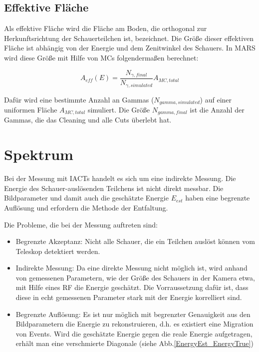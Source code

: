 \subsection{Effektive Fläche}
Als effektive Fläche wird die Fläche am Boden, die orthogonal zur Herkunftsrichtung der Schauerteilchen ist, bezeichnet.
Die Größe dieser effektiven Fläche ist abhängig von der Energie und dem Zenitwinkel des Schauers.
In MARS wird diese Größe mit Hilfe von MCs folgendermaßen berechnet:

\begin{equation}
 A_{eff}(E)=\frac{N_{\gamma, final}}{N_{\gamma, simulated}}A_{MC, total}
\end{equation}

Dafür wird eine bestimmte Anzahl an Gammas ($N_{gamma, simulated}$) auf einer uniformen Fläche $A_{MC,total}$ simuliert. 
Die Größe $N_{gamma, final}$ ist die Anzahl der Gammas, die das Cleaning und alle Cuts überlebt hat.


\section{Spektrum}
Bei der Messung mit IACTs handelt es sich um eine indirekte Messung.
Die Energie des Schauer-auslösenden Teilchens ist nicht direkt messbar.
Die Bildparameter und damit auch die geschätzte Energie $E_{est}$ haben eine begrenzte Auflösung und erfordern die Methode der Entfaltung.

Die Probleme, die bei der Messung auftreten sind:

\begin{itemize}
 \item Begrenzte Akzeptanz: Nicht alle Schauer, die ein Teilchen auslöst können vom Teleskop detektiert werden.
 \item Indirekte Messung: Da eine direkte Messung nicht möglich ist, wird anhand von gemessenen Parametern, wie der Größe des Schauers in der Kamera etwa, mit Hilfe eines RF die Energie geschätzt.
       Die Vorraussetzung dafür ist, dass diese in echt gemessenen Parameter stark mit der Energie korrelliert sind.
 \item Begrenzte Auflösung: Es ist nur möglich mit begrenzter Genauigkeit aus den Bildparametern die Energie zu rekonstruieren, d.h. es existiert eine Migration von Events.
       Wird die geschätzte Energie gegen die reale Energie aufgetragen, erhält man eine verschmierte Diagonale (siehe Abb.\ref{EnergyEst_EnergyTrue})
\end{itemize}

